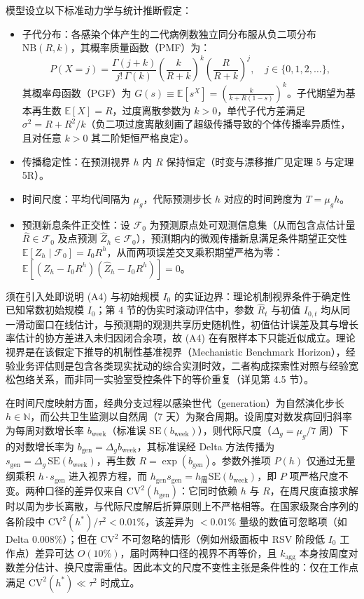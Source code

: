 \documentclass[11pt,a4paper]{article}
\theoremstyle{plain}
\theoremstyle{definition}
\begin{document}
模型设立以下标准动力学与统计推断假定：
\begin{itemize}
\item[(A1)] 子代分布：各感染个体产生的二代病例数独立同分布服从负二项分布 $\text{NB}(R, k)$，其概率质量函数（PMF）为：
\begin{equation}
P(X = j) = \frac{\Gamma(j+k)}{j!\,\Gamma(k)} \left(\frac{k}{R+k}\right)^k \left(\frac{R}{R+k}\right)^j, \quad j \in \{0, 1, 2, \dots\},
\label{eq:nb_pmf}
\end{equation}
其概率母函数（PGF）为 $G(s) \equiv \mathbb{E}[s^X] = \left(\frac{k}{k + R(1-s)}\right)^k$。子代期望为基本再生数 $\mathbb{E}[X] = R$，过度离散参数为 $k > 0$，单代子代方差满足 $\sigma^2 = R + R^2/k$（负二项过度离散刻画了超级传播导致的个体传播率异质性\citep{lloyd-smith2005superspreading, king2015avoidable}，且对任意 $k > 0$ 其二阶矩恒严格良定）。
\item[(A2)] 传播稳定性：在预测视界 $h$ 内 $R$ 保持恒定（时变与漂移推广见定理 5 与定理 5R）。
\item[(A3)] 时间尺度：平均代间隔为 $\mu_g$，代际预测步长 $h$ 对应的时间跨度为 $T = \mu_g h$。
\item[(A4)] 预测新息条件正交性：设 $\mathcal{F}_0$ 为预测原点处可观测信息集（从而包含点估计量 $\hat{R} \in \mathcal{F}_0$ 及点预测 $\hat{Z}_h \in \mathcal{F}_0$），预测期内的微观传播新息满足条件期望正交性 $\mathbb{E}[Z_h \mid \mathcal{F}_0] = I_0 R^h$，从而两项误差交叉乘积期望严格为零：$\mathbb{E}[(Z_h - I_0 R^h)(\hat{Z}_h - I_0 R^h)] = 0$。
\end{itemize}

须在引入处即说明 (A4) 与初始规模 $I_0$ 的实证边界：理论机制视界条件于确定性已知常数初始规模 $I_0$；第 4 节的伪实时滚动评估中，参数 $\hat{R}_t$ 与初值 $I_{0,t}$ 均从同一滑动窗口在线估计，与预测期的观测共享历史随机性，初值估计误差及其与增长率估计的协方差进入未归因闭合余项，故 (A4) 在有限样本下只能近似成立。理论视界是在该假定下推导的机制性基准视界（Mechanistic Benchmark Horizon），经验业务评估则是包含各类现实扰动的综合实测时效，二者构成探索性对照与经验宽松包络关系，而非同一实验室受控条件下的等价重复（详见第 4.5 节）。

在时间尺度映射方面，经典分支过程以感染世代（generation）为自然演化步长 $h \in \mathbb{N}$，而公共卫生监测以自然周（7 天）为聚合周期。设周度对数发病回归斜率为每周对数增长率 $b_{\text{week}}$（标准误 $\text{SE}(b_{\text{week}})$），则代际尺度（$\Delta_g = \mu_g/7$ 周）下的对数增长率为 $b_{\text{gen}} = \Delta_g b_{\text{week}}$，其标准误经 Delta 方法传播为 $s_{\text{gen}} = \Delta_g\,\text{SE}(b_{\text{week}})$，再生数 $R = \exp(b_{\text{gen}})$。参数外推项 $P(h)$ 仅通过无量纲乘积 $h \cdot s_{\text{gen}}$ 进入视界方程，而 $h_{\text{gen}} s_{\text{gen}} = h_{\text{周}} \text{SE}(b_{\text{week}})$，即 $P$ 项严格尺度不变。两种口径的差异仅来自 $\text{CV}^2(h_{\text{gen}})$：它同时依赖 $h$ 与 $R$，在周尺度直接求解时以周为步长离散，与代际尺度解后折算原则上不严格相等。在国家级聚合序列的各阶段中 $\text{CV}^2(h^*)/\tau^2 < 0.01\%$，该差异为 $<0.01\%$ 量级的数值可忽略项（如 Delta 0.008\%）；但在 $\text{CV}^2$ 不可忽略的情形（例如州级面板中 RSV 阶段低 $I_0$ 工作点）差异可达 $O(10\%)$，届时两种口径的视界不再等价，且 $k_{\text{agg}}$ 本身按周度对数差分估计、换尺度需重估。因此本文的尺度不变性主张是条件性的：仅在工作点满足 $\text{CV}^2(h^*) \ll \tau^2$ 时成立。
\end{document}
